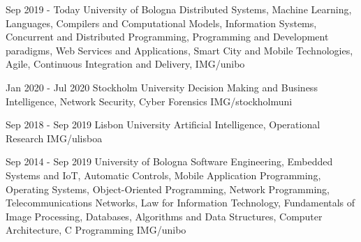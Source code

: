 \documentclass[paper=a4,fontsize=11pt, hidelinks]{temp} %
\begin{document}
\noindent

{Sep 2019 - Today}
{University of Bologna}
{Distributed Systems, Machine Learning,    Languages, Compilers and Computational Models,    Information Systems,     Concurrent and Distributed Programming,    Programming and Development paradigms,    Web Services and Applications,     Smart City and Mobile Technologies,     Agile, Continuous Integration and Delivery,  } 
{IMG/unibo}

\sepspace

{Jan 2020 - Jul 2020}
{Stockholm University}
{Decision Making and Business Intelligence, Network Security, Cyber Forensics}
{IMG/stockholmuni}

\sepspace

{Sep 2018 - Sep 2019}
{Lisbon University}
{Artificial Intelligence, Operational Research} 
{IMG/ulisboa}

\sepspace

{Sep 2014 - Sep 2019}
{University of Bologna }
{Software Engineering, Embedded Systems and IoT, Automatic Controls, Mobile Application Programming, Operating Systems, Object-Oriented Programming, Network Programming, Telecommunications Networks, Law for Information Technology, Fundamentals of Image Processing, Databases, Algorithms and Data Structures, Computer Architecture, C Programming} 
{IMG/unibo}
\end{document}
